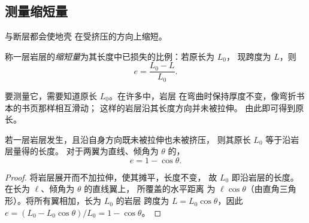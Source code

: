 \subsection{测量缩短量}

与断层都会使地壳
在受挤压的方向上缩短。

\begin{definition}[缩短量]\label{def:g12:mountain-building:shortening}
称一层岩层的\emph{缩短量}为其长度中已损失的比例：若原长为 $L_0$，
现跨度为 $L$，则
\[
  e = \frac{L_0 - L}{L_0}.
\]
\end{definition}

要测量它，需要知道原长 $L_0$。在许多中，岩层
在弯曲时保持厚度不变，像弯折书本的书页那样相互滑动；
这样的岩层沿其长度方向并未被拉伸。
由此即可得到原长。

\begin{proposition}[褶皱岩层的缩短量]\label{prop:g12:mountain-building:shortening}
若一层岩层发生，且沿自身方向既未被拉伸也未被挤压，
则其原长 $L_0$ 等于沿岩层量得的长度。
对于两翼为直线、倾角为 $\theta$ 的，
\[
  e = 1 - \cos\theta .
\]
\end{proposition}

\begin{proof}
将岩层展开而不加拉伸，使其摊平，长度不变，
故 $L_0$ 即沿岩层的长度。在长为 $\ell$、倾角为 $\theta$ 的直线翼上，
所覆盖的水平距离
为 $\ell\cos\theta$（由直角三角形）。将所有翼相加，长为 $L_0$ 的岩层
跨度为 $L = L_0\cos\theta$，因此 $e = (L_0 - L_0\cos\theta)/L_0 =
1 - \cos\theta$。
\end{proof}

